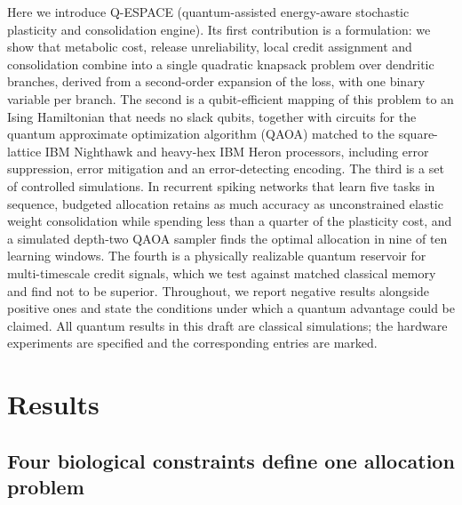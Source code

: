 \documentclass[12pt,a4paper]{article}
\begin{document}
Here we introduce Q-ESPACE (quantum-assisted energy-aware stochastic plasticity and consolidation engine). Its first contribution is a formulation: we show that metabolic cost, release unreliability, local credit assignment and consolidation combine into a single quadratic knapsack problem over dendritic branches, derived from a second-order expansion of the loss, with one binary variable per branch. The second is a qubit-efficient mapping of this problem to an Ising Hamiltonian that needs no slack qubits, together with circuits for the quantum approximate optimization algorithm (QAOA)\cite{farhi2014,blekos2024} matched to the square-lattice IBM Nighthawk and heavy-hex IBM Heron processors\cite{ibm2026}, including error suppression, error mitigation and an error-detecting encoding. The third is a set of controlled simulations. In recurrent spiking networks that learn five tasks in sequence, budgeted allocation retains as much accuracy as unconstrained elastic weight consolidation while spending less than a quarter of the plasticity cost, and a simulated depth-two QAOA sampler finds the optimal allocation in nine of ten learning windows. The fourth is a physically realizable quantum reservoir for multi-timescale credit signals, which we test against matched classical memory and find not to be superior. Throughout, we report negative results alongside positive ones and state the conditions under which a quantum advantage could be claimed. All quantum results in this draft are classical simulations; the hardware experiments are specified and the corresponding entries are marked.

\section*{Results}

\subsection*{Four biological constraints define one allocation problem}
\end{document}
